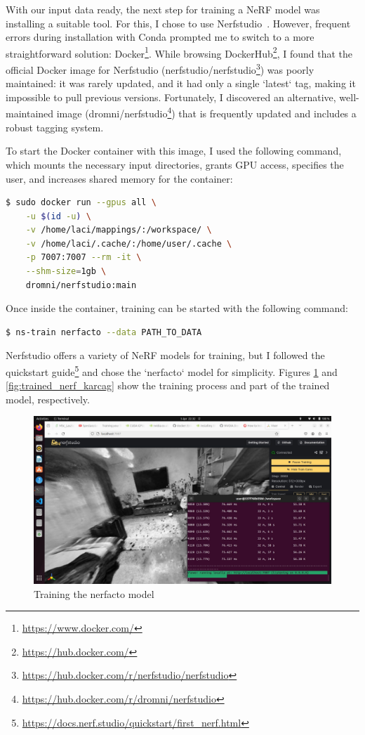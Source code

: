 With our input data ready, the next step for training a NeRF model was installing a suitable tool. For this, I chose to use Nerfstudio~\cite{nerfstudio}. However, frequent errors during installation with Conda prompted me to switch to a more straightforward solution: Docker\footnote{\url{https://www.docker.com/}}. While browsing DockerHub\footnote{\url{https://hub.docker.com/}}, I found that the official Docker image for Nerfstudio (nerfstudio/nerfstudio\footnote{\url{https://hub.docker.com/r/nerfstudio/nerfstudio}}) was poorly maintained: it was rarely updated, and it had only a single `latest` tag, making it impossible to pull previous versions. Fortunately, I discovered an alternative, well-maintained image (dromni/nerfstudio\footnote{\url{https://hub.docker.com/r/dromni/nerfstudio}}) that is frequently updated and includes a robust tagging system.

To start the Docker container with this image, I used the following command, which mounts the necessary input directories, grants GPU access, specifies the user, and increases shared memory for the container:

\FloatBarrier
\begin{lstlisting}[language=bash,frame=single,float=!ht]
$ sudo docker run --gpus all \
    -u $(id -u) \
    -v /home/laci/mappings/:/workspace/ \
    -v /home/laci/.cache/:/home/user/.cache \
    -p 7007:7007 --rm -it \
    --shm-size=1gb \
    dromni/nerfstudio:main
\end{lstlisting}

Once inside the container, training can be started with the following command:
\FloatBarrier
\begin{lstlisting}[language=bash,frame=single,float=!ht]
$ ns-train nerfacto --data PATH_TO_DATA
\end{lstlisting}

Nerfstudio offers a variety of NeRF models for training, but I followed the quickstart guide\footnote{\url{https://docs.nerf.studio/quickstart/first_nerf.html}} and chose the `nerfacto` model for simplicity. Figures \ref{fig:training_nerf_karcag} and \ref{fig:trained_nerf_karcag} show the training process and part of the trained model, respectively.

\begin{figure}[htbp]
	\centering
	\includegraphics[width=150mm, keepaspectratio]{figures_jpg/nerfstudio.jpg}
	\caption{Training the nerfacto model}
	\label{fig:training_nerf_karcag}
\end{figure}

